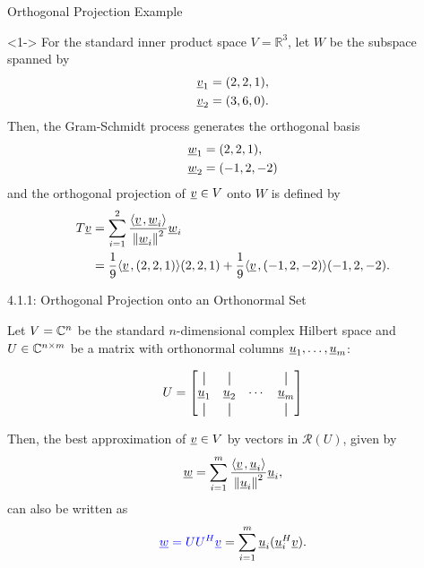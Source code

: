 \documentclass[10pt,english,aspectratio=169]{beamer}
\begin{document}
\begin{frame}{Orthogonal Projection Example}

\begin{example}<1->
For the standard inner product space $V = \mathbb{R}^3$, let $W$ be the subspace spanned by\vspace{-4mm}
\begin{align*}
\underline{v}_1 &= (2,2,1), \\
\underline{v}_2 &= (3,6,0).
\end{align*}
Then, the Gram-Schmidt process generates the orthogonal basis
 \vspace{-2mm}
\begin{align*}
\underline{w}_1 &= (2,2,1), \\
\underline{w}_2 &= (-1,2,-2)
\end{align*}
and the orthogonal projection of $\underline{v} \in V$ onto $W$ is defined by \vspace{-2mm}
\begin{align*}
T \underline{v} &= \sum_{i=1}^2 \frac{ {\left\langle  \underline{v}  \mskip2mu ,  \underline{w}_i  \right\rangle} }{ \left\| \underline{w}_i \right\|^2 } \underline{w}_i \\ &= \frac{1}{9} {\left\langle  \underline{v}  \mskip2mu ,  (2,2,1)  \right\rangle} (2,2,1) + \frac{1}{9} {\left\langle  \underline{v}  \mskip2mu ,  (-1,2,-2)  \right\rangle} (-1,2,-2).
\end{align*}
\vspace*{-3.5mm}
\end{example}

\end{frame}


\newcommand*{\vertbar}{\rule[-1ex]{0.5pt}{2.5ex}}

\begin{frame}{4.1.1: Orthogonal Projection onto an Orthonormal Set}

Let $V = \mathbb{C}^n$ be the standard $n$-dimensional complex Hilbert space and $U \in \mathbb{C}^{n\times m}$ be a matrix with orthonormal columns $\underline{u}_1,\ldots,\underline{u}_m$:

\[ U = \begin{bmatrix} \vertbar & \vertbar & & \vertbar \\ \vecnot{u}_1 & \vecnot{u}_2 & \cdots & \vecnot{u}_m \\ \vertbar & \vertbar & & \vertbar \end{bmatrix} \]

\vspace{4mm}

Then, the best approximation of $\underline{v}\in V$ by vectors in $\mathcal{R}(U)$, given by
\begin{equation*}
\underline{w} = \sum_{i=1}^m \frac{ {\left\langle  \underline{v}  \mskip2mu ,  \underline{u}_i  \right\rangle} }{ \left\| \underline{u}_i \right\|^2 } \underline{u}_i,
\end{equation*}
can also be written as
\[ {\color{blue}\underline{w} = U U^H \underline{v}} = \sum_{i=1}^m \underline{u}_i (\underline{u}_i^H \underline{v}). \]

\end{frame}
\end{document}
